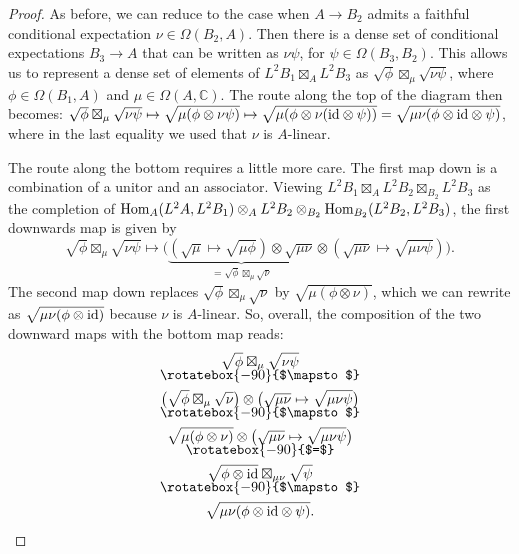 \documentclass[10pt,a4paper,oneside]{amsart}
\theoremstyle{remark}
\theoremstyle{definition}
\newcommand{\Hom}{\textnormal{Hom}}
\newcommand{\rar}{\rightarrow}
\newcommand{\id}{\textnormal{id}}
\begin{document}
\begin{proof}
As before, we can reduce to the case when $A \rar B_2$ admits a faithful conditional expectation $\nu \in \Omega(B_2,A)$. Then there is a dense set of conditional expectations $B_3 \rar A$ that can be written as $\nu \psi$, for $\psi\in \Omega(B_3, B_2)$. This allows us to represent a dense set of elements of $L^2B_1 {\boxtimes}_A L^2 B_3$ as $\sqrt{\phi} \boxtimes_\mu \sqrt{\nu \psi}$, where $\phi\in \Omega(B_1,A)$ and $\mu \in \Omega(A,\mathbb{C})$. The route along the top of the diagram then becomes:
    $
    \sqrt{\phi} \boxtimes_\mu \sqrt{\nu \psi}\mapsto \sqrt{\mu(\phi \otimes \nu \psi)} \mapsto \sqrt{\mu(\phi \otimes \nu (\id \otimes \psi)) } = \sqrt{\mu \nu (\phi \otimes \id \otimes \psi)}$,
    where in the last equality we used that $\nu$ is $A$-linear.
    
    The route along the bottom requires a little more care. The first map down is a combination of a unitor and an associator. Viewing $L^2B_1 \boxtimes_AL^2 B_2 \boxtimes_{B_2}L^2B_3$ as the completion of $
    \Hom_{A}(L^2A,L^2B_1)
    \otimes_A L^2 B_2 \otimes_{B_2}\Hom_{B_2}(L^2B_2,L^2B_3)$, the first downwards map is given by
    $$
    \sqrt{\phi} \boxtimes_\mu \sqrt{\nu \psi}
    \mapsto
    \big(\underbrace{(\sqrt{\mu} \mapsto \sqrt{\mu \phi})\otimes\sqrt{\mu \nu}}_{\textstyle=\sqrt{\phi}\boxtimes_\mu \sqrt{\nu}}\otimes (\sqrt{\mu\nu}\mapsto \sqrt{\mu \nu \psi})\big).
    $$
    The second map down replaces $\sqrt{\phi}\boxtimes_\mu \sqrt{\nu}$ by $\sqrt{\mu(\phi \otimes\nu)}$, which we can rewrite as $\sqrt{\mu\nu(\phi \otimes \id)}$ because $\nu$ is $A$-linear.
    So, overall, the composition of the two downward maps with the bottom map reads:
    \begin{gather*}
    \sqrt{\phi} \boxtimes_\mu \sqrt{\nu \psi}
    \\[-2mm]\rotatebox{-90}{$\mapsto$}\\
    \big(\sqrt{\phi}\boxtimes_\mu \sqrt{\nu}\big)\otimes \big(\sqrt{\mu\nu}\mapsto \sqrt{\mu \nu \psi}\big)
    \\[-2mm]\rotatebox{-90}{$\mapsto$}\\
    \sqrt{\mu(\phi \otimes\nu)}\otimes \big(\sqrt{\mu\nu}\mapsto \sqrt{\mu \nu \psi}\big)
    \\[-2mm]\rotatebox{-90}{$=$}\\
    \sqrt{\phi\otimes \id}\boxtimes_{\mu \nu} \sqrt{\psi}
    \\[-2mm]\rotatebox{-90}{$\mapsto$}\\
    \sqrt{\mu \nu (\phi \otimes \id \otimes \psi)}.\qedhere
    \end{gather*}
\end{proof}
\end{document}
